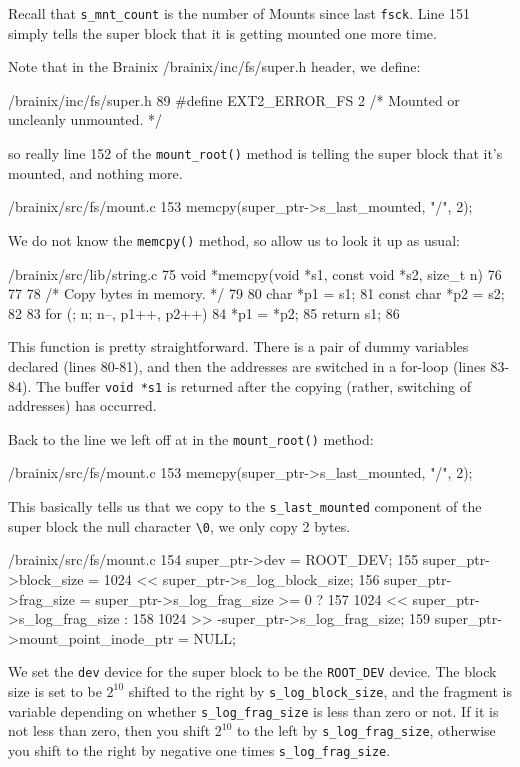 \documentclass{article}
\begin{document}
Recall that \verb|s_mnt_count| is the number of Mounts since last \verb|fsck|. Line 151 simply tells the super block that it is getting mounted one more time.

Note that in the Brainix /brainix/inc/fs/super.h header, we define:
\begin{code}{/brainix/inc/fs/super.h}
89 #define EXT2_ERROR_FS		2 /* Mounted or uncleanly unmounted. */
\end{code}
so really line 152 of the \verb|mount_root()| method is telling the super block that it's mounted, and nothing more.

\begin{code}{/brainix/src/fs/mount.c}
153      memcpy(super_ptr->s_last_mounted, "/\0", 2);
\end{code}
We do not know the \verb|memcpy()| method, so allow us to look it up as usual: 
\begin{code}{/brainix/src/lib/string.c}
75 void *memcpy(void *s1, const void *s2, size_t n)
76 {
77
78 /* Copy bytes in memory. */
79 
80      char *p1 = s1;
81      const char *p2 = s2;
82 
83      for (; n; n--, p1++, p2++)
84           *p1 = *p2;
85      return s1;
86 }
\end{code}
This function is pretty straightforward. There is a pair of dummy variables declared (lines 80-81), and then the addresses are switched in a for-loop (lines 83-84). The buffer \verb|void *s1| is returned after the copying (rather, switching of addresses) has occurred.

Back to the line we left off at in the \verb|mount_root()| method:
\begin{code}{/brainix/src/fs/mount.c}
153      memcpy(super_ptr->s_last_mounted, "/\0", 2);
\end{code}
This basically tells us that we copy to the \verb|s_last_mounted| component of the super block the null character \verb|\0|, we only copy 2 bytes.

\begin{code}{/brainix/src/fs/mount.c}
154      super_ptr->dev = ROOT_DEV;
155      super_ptr->block_size = 1024 << super_ptr->s_log_block_size;
156      super_ptr->frag_size = super_ptr->s_log_frag_size >= 0 ?
157           1024 << super_ptr->s_log_frag_size :
158           1024 >> -super_ptr->s_log_frag_size;
159      super_ptr->mount_point_inode_ptr = NULL;
\end{code}
We set the \verb|dev| device for the super block to be the \verb|ROOT_DEV| device. The block size is set to be $2^{10}$ shifted to the right by \verb|s_log_block_size|, and the fragment is variable depending on whether \verb|s_log_frag_size| is less than zero or not. If it is not less than zero, then you shift $2^{10}$ to the left by \verb|s_log_frag_size|, otherwise you shift to the right by negative one times \verb|s_log_frag_size|.
\end{document}
